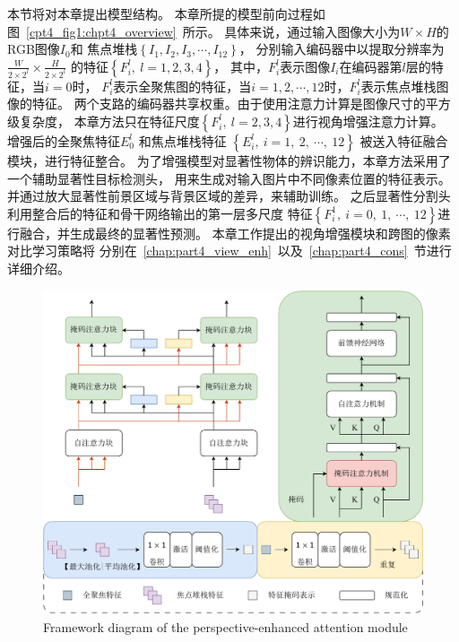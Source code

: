 本节将对本章提出模型结构。
本章所提的模型前向过程如图~\ref{cpt4_fig1:chpt4_overview}~所示。
具体来说，通过输入图像大小为$W \times H$的RGB图像$I_{0}$和
焦点堆栈$\left \{  I_{1},I_{2},I_{3},\cdots,I_{12} \right \} $，
分别输入编码器中以提取分辨率为$\frac{W}{2 \times 2^{l}} \times \frac{H}{2  \times 2^{l}} $ 
的特征$\left \{ F_{i}^{l},~l=1,2,3,4 \right \}$，
其中，$F_{i}^{l}$表示图像$I_{i}$在编码器第$l$层的特征，当$i=0$时，
$F_{i}^{l}$表示全聚焦图的特征，当$i=1,2,\cdots,12$时，$F_{i}^{l}$表示焦点堆栈图像的特征。
两个支路的编码器共享权重。由于使用注意力计算是图像尺寸的平方级复杂度，
本章方法只在特征尺度$\left \{ F_{i}^{l},~ l = 2, 3, 4\right \}$进行视角增强注意力计算。
增强后的全聚焦特征$ E_{0}^{l} $ 和焦点堆栈特征 $\left \{ E_{i}^{l},~i=1,~2,~ \cdots,~12 \right \}$
被送入特征融合模块，进行特征整合。
为了增强模型对显著性物体的辨识能力，本章方法采用了一个辅助显著性目标检测头，
用来生成对输入图片中不同像素位置的特征表示。并通过放大显著性前景区域与背景区域的差异，来辅助训练。
之后显著性分割头利用整合后的特征和骨干网络输出的第一层多尺度
特征$\left \{ F_{i}^{1},~i=0,~1,~ \cdots, ~12 \right \}$进行融合，并生成最终的显著性预测。
%
%
%
%
%
%
本章工作提出的视角增强模块和跨图的像素对比学习策略将
分别在~\ref{chap:part4_view_enh}~以及~\ref{chap:part4_cons}~节进行详细介绍。









\label{chap:part4_view_enh}


\begin{figure}[!ht]
	\centering
	\includegraphics[width=0.95\linewidth]{figures/chapter4/view_enhance}
	{Framework diagram of the perspective-enhanced attention module}
	\label{cpt4_fig1:view_enhance}
\end{figure}



